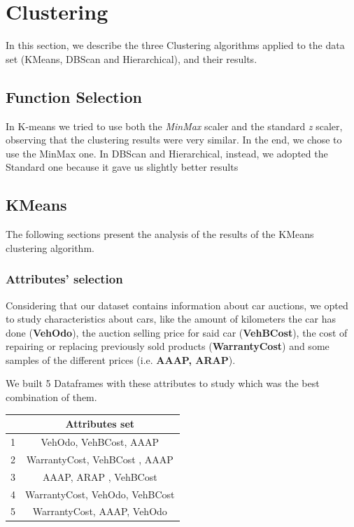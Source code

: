 \documentclass{article}
\begin{document}
	\newpage
	\section{Clustering}
	\label{sec:clustering}
	In this section, we describe the three Clustering algorithms applied to the data set (KMeans, DBScan and Hierarchical), and their results.
	
	\subsection{Function Selection}
	In K-means we tried to use both the \emph{MinMax} scaler and the standard \emph{z} scaler, observing that the clustering results were very similar. In the end, we chose to use the MinMax one. 
	In DBScan and Hierarchical, instead, we adopted the Standard one because it gave us slightly better results
	
	\subsection{KMeans}
	The following sections present the analysis of the results of the KMeans clustering algorithm.
	
	\subsubsection{Attributes' selection}
	Considering that our dataset contains information about car auctions, we opted to study characteristics about cars, like the amount of kilometers the car has done (\textbf{VehOdo}), the auction selling price for said car (\textbf{VehBCost}), the cost of repairing or replacing previously sold products (\textbf{WarrantyCost}) and some samples of the different prices (i.e. \textbf{AAAP, ARAP}).
	
	We built 5 Dataframes with these attributes to study which was the best combination of them.
	
	\begin{table}[H]
		\centering
		\begin{tabular}{|c|c|}
			\hline
			& Attributes set \\
			\hline
			\rowcolor{Gray}
			1 & VehOdo,  VehBCost,  AAAP \\
			2 & WarrantyCost, VehBCost ,  AAAP  \\
			\rowcolor{Gray}
			3 & AAAP,  ARAP ,  VehBCost \\
			4 & WarrantyCost,  VehOdo,  VehBCost  \\
			\rowcolor{Gray}
			5 & WarrantyCost,  AAAP, VehOdo \\
			\hline
		\end{tabular}
	\end{table}
	
\end{document}
